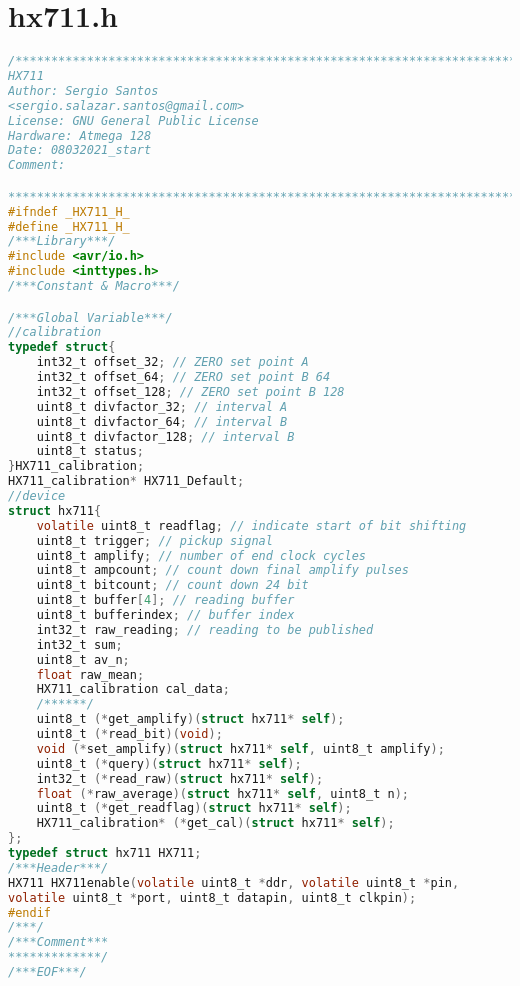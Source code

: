 \chapter{hx711.h}
\begin{lstlisting}[language=C, caption={hx711.h}, label=hx711-h, captionpos=b]
/************************************************************************
HX711
Author: Sergio Santos
<sergio.salazar.santos@gmail.com>
License: GNU General Public License
Hardware: Atmega 128
Date: 08032021_start
Comment:

************************************************************************/
#ifndef _HX711_H_
#define _HX711_H_
/***Library***/
#include <avr/io.h>
#include <inttypes.h>
/***Constant & Macro***/

/***Global Variable***/
//calibration
typedef struct{
	int32_t offset_32; // ZERO set point A
	int32_t offset_64; // ZERO set point B 64
	int32_t offset_128; // ZERO set point B 128
	uint8_t divfactor_32; // interval A
	uint8_t divfactor_64; // interval B
	uint8_t divfactor_128; // interval B
	uint8_t status;
}HX711_calibration;
HX711_calibration* HX711_Default;
//device
struct hx711{
	volatile uint8_t readflag; // indicate start of bit shifting
	uint8_t trigger; // pickup signal
	uint8_t amplify; // number of end clock cycles
	uint8_t ampcount; // count down final amplify pulses
	uint8_t bitcount; // count down 24 bit
	uint8_t buffer[4]; // reading buffer
	uint8_t bufferindex; // buffer index
	int32_t raw_reading; // reading to be published
	int32_t sum;
	uint8_t av_n;
	float raw_mean;
	HX711_calibration cal_data;
	/******/
	uint8_t (*get_amplify)(struct hx711* self);
	uint8_t (*read_bit)(void);
	void (*set_amplify)(struct hx711* self, uint8_t amplify);
	uint8_t (*query)(struct hx711* self);
	int32_t (*read_raw)(struct hx711* self);
	float (*raw_average)(struct hx711* self, uint8_t n);
	uint8_t (*get_readflag)(struct hx711* self);
	HX711_calibration* (*get_cal)(struct hx711* self);
};
typedef struct hx711 HX711;
/***Header***/
HX711 HX711enable(volatile uint8_t *ddr, volatile uint8_t *pin,
volatile uint8_t *port, uint8_t datapin, uint8_t clkpin);
#endif
/***/
/***Comment***
*************/
/***EOF***/
\end{lstlisting}
